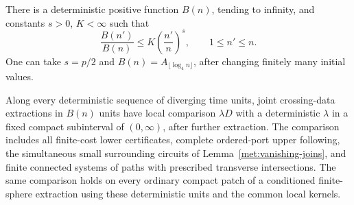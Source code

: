 \begin{theorem}
\label{met:normalizers}
There is a deterministic positive function $B(n)$, tending to
infinity, and constants $s>0$, $K<\infty$ such that
\begin{equation}
 \frac{B(n')}{B(n)}\leq K\left(\frac{n'}n\right)^s,
 \qquad 1\leq n'\leq n.
 \label{met:polynomial-ratio}
\end{equation}
One can take $s=p/2$ and $B(n)=A_{\lfloor\log_4n\rfloor}$,
after changing finitely many initial values.

Along every deterministic sequence of diverging time units, joint
crossing-data extractions in $B(n)$ units have local comparison
$\lambda D$ with a deterministic $\lambda$ in a fixed compact
subinterval of $(0,\infty)$, after further extraction.  The
comparison includes all finite-cost lower certificates, complete
ordered-port upper following, the simultaneous small surrounding
circuits of Lemma~\ref{met:vanishing-joins}, and finite connected
systems of paths with prescribed transverse intersections.
The same comparison holds on every ordinary compact patch of a
conditioned finite-sphere extraction using these deterministic
units and the common local kernels.
\end{theorem}

